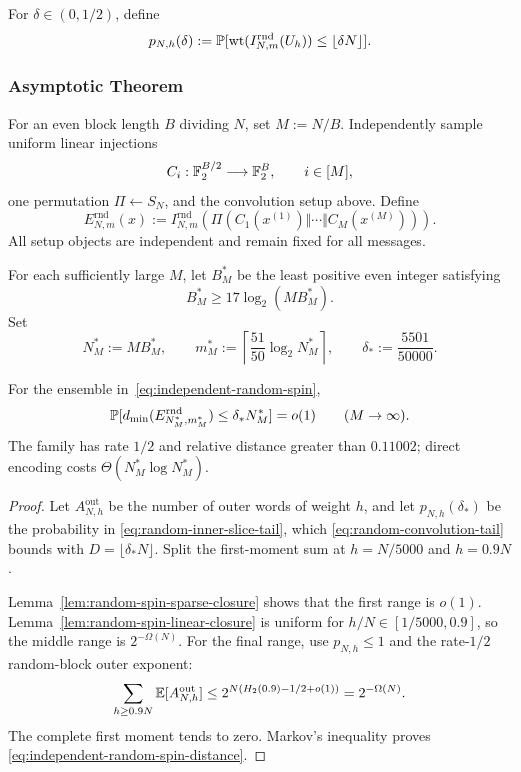 For $\delta\in(0,1/2)$, define
\begin{equation}
  p_{N,h}(\delta)
  :=
  \mathbb P[
    \operatorname{wt}(I_{N,m}^{\mathrm{rnd}}(U_h))
    \le\lfloor\delta N\rfloor
  ].
  \label{eq:random-inner-slice-tail}
\end{equation}

\subsubsection{Asymptotic Theorem}

For an even block length $B$ dividing $N$, set $M:=N/B$. Independently
sample uniform linear injections
\[
  C_i:\mathbb F_2^{B/2}\longrightarrow\mathbb F_2^B,
  \qquad i\in[M],
\]
one permutation $\Pi\gets S_N$, and the convolution setup above. Define
\begin{equation}
  E_{N,m}^{\mathrm{rnd}}(x)
  :=
  I_{N,m}^{\mathrm{rnd}}\!\left(
    \Pi(C_1(x^{(1)})\Vert\cdots\Vert C_M(x^{(M)}))
  \right).
  \label{eq:independent-random-spin}
\end{equation}
All setup objects are independent and remain fixed for all messages.

For each sufficiently large $M$, let $B_M^*$ be the least positive even
integer satisfying
\[
  B_M^*\ge17\log_2(MB_M^*).
\]
Set
\[
  N_M^*:=MB_M^*,
  \qquad
  m_M^*:=\left\lceil\frac{51}{50}\log_2N_M^*\right\rceil,
  \qquad
  \delta_*:=\frac{5501}{50000}.
\]

\begin{theorem}
\label{thm:independent-random-spin}
For the ensemble in~\eqref{eq:independent-random-spin},
\begin{equation}
  \mathbb P[
    d_{\min}(E_{N_M^*,m_M^*}^{\mathrm{rnd}})
    \le\delta_*N_M^*
  ]
  =o(1)
  \qquad(M\to\infty).
  \label{eq:independent-random-spin-distance}
\end{equation}
The family has rate $1/2$ and relative distance greater than $0.11002$;
direct encoding costs $\Theta(N_M^*\log N_M^*)$.
\end{theorem}

\begin{proof}
Let $A_{N,h}^{\mathrm{out}}$ be the number of outer words of weight $h$, and
let $p_{N,h}(\delta_*)$ be the probability in
\eqref{eq:random-inner-slice-tail}, which
\eqref{eq:random-convolution-tail} bounds with
$D=\lfloor\delta_*N\rfloor$. Split the first-moment sum at
$h=N/5000$ and $h=0.9N$.

Lemma~\ref{lem:random-spin-sparse-closure} shows that the first range is
$o(1)$. Lemma~\ref{lem:random-spin-linear-closure} is uniform for
$h/N\in[1/5000,0.9]$, so the middle range is $2^{-\Omega(N)}$. For the final
range, use $p_{N,h}\le1$ and the rate-$1/2$ random-block outer exponent:
\[
  \sum_{h\ge0.9N}\mathbb E[A_{N,h}^{\mathrm{out}}]
  \le
  2^{N(H_2(0.9)-1/2+o(1))}
  =2^{-\Omega(N)}.
\]
The complete first moment tends to zero. Markov's inequality proves
\eqref{eq:independent-random-spin-distance}.
\end{proof}


